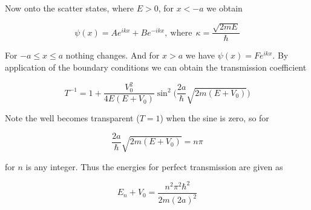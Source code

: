 \documentclass[a4paper]{article}
\begin{document}
Now onto the scatter states, where $E>0$, for $x<-a$ we obtain

\begin{equation}
	\psi(x)=Ae^{ikx}+Be^{-ikx}, \ \text{where}\ \ \kappa=\frac{\sqrt{2mE}}{\hbar}
\end{equation}

For $-a\le x\le a$ nothing changes. And for $x>a$ we have $\psi(x)=Fe^{ikx}$. By application of the boundary conditions we can obtain the transmission coefficient

\begin{equation}
	T^{-1} = 1+\frac{V_0^2}{4E(E+V_0)}\sin^2\bigg(\frac{2a}{\hbar}\sqrt{2m(E+V_0)}\bigg)
\end{equation}

Note the well becomes transparent ($T=1$) when the sine is zero, so for

\begin{equation}
	\frac{2a}{\hbar}\sqrt{2m(E+V_0)}=n\pi
\end{equation}

for $n$ is any integer. Thus the energies for perfect transmission are given as

\begin{equation}
	E_n+V_0=\frac{n^2\pi^2\hbar^2}{2m(2a)^2}
\end{equation}
\end{document}
